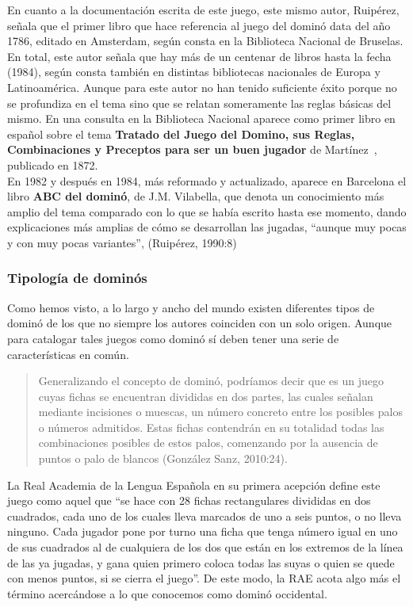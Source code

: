 En cuanto a la documentación escrita de este juego, este mismo autor,
Ruipérez, señala que el primer libro que hace referencia al juego del
dominó data del año 1786, editado en Amsterdam, según consta en la
Biblioteca Nacional de Bruselas. En total, este autor señala que hay
más de un centenar de libros hasta la fecha (1984), según consta
también en distintas bibliotecas nacionales de Europa y
Latinoamérica. Aunque para este autor no han tenido suficiente éxito
porque no se profundiza en el tema sino que se relatan someramente las
reglas básicas del mismo. En una consulta en la Biblioteca Nacional
aparece como primer libro en español sobre el tema \textbf{Tratado del Juego del Domino, sus Reglas, Combinaciones y Preceptos para ser un buen jugador} de Martínez~\cite{Martinez}, publicado en 1872. \\

En 1982 y después en 1984, más reformado y actualizado, aparece en Barcelona el libro \textbf{ABC del dominó},
de J.M. Vilabella, que denota un conocimiento más amplio del tema comparado con lo que se había
escrito hasta ese momento, dando explicaciones más amplias de cómo se desarrollan las jugadas,
“aunque muy pocas y con muy pocas variantes”, (Ruipérez, 1990:8)

\subsubsection{Tipología de dominós}

Como hemos visto, a lo largo y ancho del mundo existen diferentes tipos de dominó de los que no
siempre los autores coinciden con un solo origen. Aunque para catalogar tales juegos como dominó sí
deben tener una serie de características en común. 

\begin{quote}
Generalizando el concepto de dominó, podríamos decir que es un juego cuyas fichas se encuentran
divididas en dos partes, las cuales señalan mediante incisiones o muescas, un número concreto entre
los posibles palos o números admitidos. Estas fichas contendrán en su totalidad todas las
combinaciones posibles de estos palos, comenzando por la ausencia de puntos o palo de blancos
(González Sanz, 2010:24).
\end{quote}

La Real Academia de la Lengua Española en su primera acepción define este juego como aquel que
“se hace con 28 fichas rectangulares divididas en dos cuadrados, cada uno de los cuales lleva marcados
de uno a seis puntos, o no lleva ninguno. Cada jugador pone por turno una ficha que tenga número
igual en uno de sus cuadrados al de cualquiera de los dos que están en los extremos de la línea de
las ya jugadas, y gana quien primero coloca todas las suyas o quien se quede con menos puntos, si
se cierra el juego”. De este modo, la RAE acota algo más el término acercándose a lo que conocemos
como dominó occidental. \\

